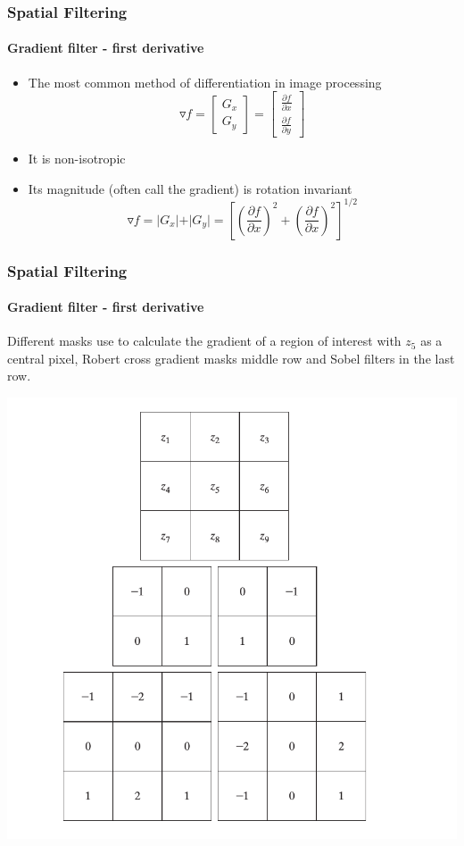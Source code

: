 \documentclass[table]{beamer}
\begin{document}
\begin{frame}
\frametitle{Spatial Filtering}
\framesubtitle{Gradient filter - first derivative}
\begin{itemize}
\item The most common method of differentiation in image processing
 $$\triangledown f = 
\begin{bmatrix}
G_x\\G_y
\end{bmatrix} = 
\begin{bmatrix}
\frac{\partial f}{\partial x}\\
 \frac{\partial f}{\partial y}
 \end{bmatrix}
$$
\item It is non-isotropic
\item Its magnitude (often call the gradient) is rotation invariant
$$\triangledown f = \vert G_{x} \vert + \vert G_{y} \vert = [(\frac{\partial f}{\partial x})^2 + (\frac{\partial f}{\partial x})^2]^{1/2} $$
\end{itemize}

\end{frame}
\begin{frame}
\frametitle{Spatial Filtering}
\framesubtitle{Gradient filter - first derivative}
Different masks use to calculate the gradient of a region of interest with $z_{5}$ as a central pixel, Robert cross gradient masks middle row and  Sobel filters in the last row.
\begin{center}
\includegraphics[scale=0.26]{images/Spatial10-gradient.png}
\end{center}
\end{frame}
\end{document}
